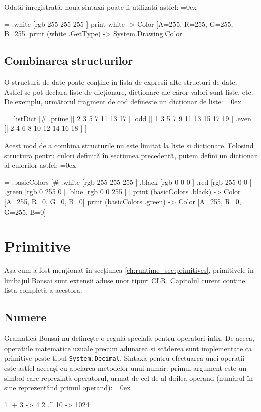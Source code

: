 \documentclass[12pt,a4paper]{memoir}
\renewcommand{\c}{\texttt}
\newenvironment{code}
{
\definecolor{shadecolor}{gray}{0.91}
\topsep=0ex
\relax
\shaded
\verbatim
}
{
\endverbatim
\endshaded
}
\begin{document}
Odată înregistrată, noua sintaxă poate fi utilizată astfel:
\begin{code}
= .white [rgb 255 255 255 ]
print white
  -> Color [A=255, R=255, G=255, B=255]
print (white .GetType)
  -> System.Drawing.Color
\end{code}

\section{Combinarea structurilor}

O structură de date poate conține în lista de expresii alte structuri de date. Astfel se pot declara liste de dicționare, dicționare ale căror valori sunt liste, etc. De exemplu, următorul fragment de cod definește un dicționar de liste:
\begin{code}
= .listDict [#
  .prime [| 2 3 5 7 11 13 17 ]
  .odd [| 1 3 5 7 9 11 13 15 17 19 ]
  .even [| 2 4 6 8 10 12 14 16 18 ]
]
\end{code}

Acest mod de a combina structurile nu este limitat la liste și dicționare. Folosind structura pentru culori definită în secțiunea precedentă, putem defini un dicționar al culorilor astfel:
\begin{code}
= .basicColors [#
  .white [rgb 255 255 255 ]
  .black [rgb 0 0 0 ]
  .red [rgb 255 0 0 ]
  .green [rgb 0 255 0 ]
  .blue [rgb 0 0 255 ]
]
print (basicColors .black)
  -> Color [A=255, R=0, G=0, B=0]
print (basicColors .green)
  -> Color [A=255, R=0, G=255, B=0]
\end{code}

\chapter{Primitive}\label{ch:Primitives}

Așa cum a fost menționat în secțiunea \ref{ch:runtime_sec:primitives}, primitivele în limbajul Bonsai sunt extensii aduse unor tipuri CLR. Capitolul curent conține lista completă a acestora.

\section{Numere}

Gramatică Bonsai nu definește o regulă specială pentru operatori infix. De aceea, operațiile matematice uzuale precum adunarea și scăderea sunt implementate ca primitive peste tipul \c{System.Decimal}. Sintaxa pentru efectuarea unei operații este astfel aceeași cu apelarea metodelor unui număr: primul argument este un simbol care reprezintă operatorul, urmat de cel de-al doilea operand (numărul în sine reprezentând primul operand):
\begin{code}
1 .+ 3 
  -> 4
2 .^ 10
  -> 1024
\end{code}
\end{document}
